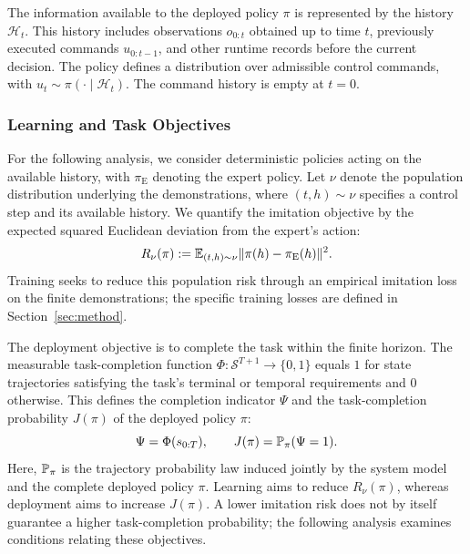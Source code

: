 The information available to the deployed policy $\pi$ is represented by the history $\mathcal H_t$.
This history includes observations $o_{0:t}$ obtained up to time $t$, previously executed commands $u_{0:t-1}$, 
and other runtime records before the current decision.
The policy defines a distribution over admissible control commands,
with $u_t\sim\pi(\cdot\mid\mathcal H_t)$.
The command history is empty at $t=0$.

\subsubsection{Learning and Task Objectives}
For the following analysis, we consider deterministic policies acting on the available history,
with $\pi_{\mathrm E}$ denoting the expert policy.
Let $\nu$ denote the population distribution underlying the demonstrations,
where $(t,h)\sim\nu$ specifies a control step and its available history.
We quantify the imitation objective by the expected squared Euclidean deviation from the expert's action:
\begin{equation}
 R_\nu(\pi)
 :=\mathbb E_{(t,h)\sim\nu}\lVert\pi(h)-\pi_{\mathrm E}(h)\rVert^2.
 \label{eq:populationimitationrisk}
\end{equation}
Training seeks to reduce this population risk through an empirical imitation loss
on the finite demonstrations; the specific training losses are defined in Section~\ref{sec:method}.

The deployment objective is to complete the task within the finite horizon.
The measurable task-completion function $\Phi:\mathcal S^{T+1}\to\{0,1\}$ equals $1$
for state trajectories satisfying the task's terminal or temporal requirements and $0$ otherwise.
This defines the completion indicator $\Psi$ and the task-completion probability $J(\pi)$ of the deployed policy $\pi$:
\begin{equation}
 \Psi=\Phi(s_{0:T}),\qquad
 J(\pi)=\mathbb P_\pi(\Psi=1).
 \label{eq:visualtask}
\end{equation}
Here, $\mathbb P_\pi$ is the trajectory probability law induced jointly by the system model
and the complete deployed policy $\pi$.
Learning aims to reduce $R_\nu(\pi)$, whereas deployment aims to increase $J(\pi)$.
A lower imitation risk does not by itself guarantee a higher task-completion probability;
the following analysis examines conditions relating these objectives.


